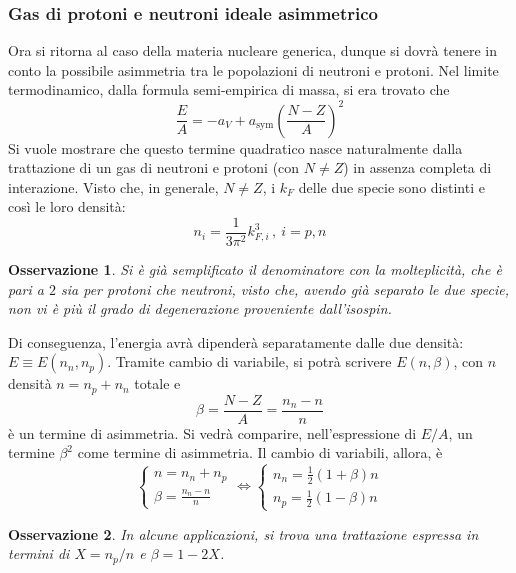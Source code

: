 \documentclass[11pt, a4paper]{scrartcl}
\theoremstyle{style}
\newtheorem{osservazione}{Osservazione}[section]
\numberwithin{equation}{subsection}
\begin{document}
\subsubsection{Gas di protoni e neutroni ideale asimmetrico}

Ora si ritorna al caso della materia nucleare generica, dunque si dovr\`a tenere in conto la possibile asimmetria tra le popolazioni di neutroni e protoni.
Nel limite termodinamico, dalla formula semi-empirica di massa, si era trovato che
\[
\frac{E}{A} = -a_V + a_\text{sym}\left(\frac{N-Z}{A}\right) ^2
\] 
Si vuole mostrare che questo termine quadratico nasce naturalmente dalla trattazione di un gas di neutroni e protoni (con $N\neq Z$) in assenza completa di interazione.
Visto che, in generale, $N\neq Z$, i $k_F$ delle due specie sono distinti e cos\`i le loro densit\`a: 
\[
n_i = \frac{1}{3\pi^2} k_{F,i}^3\, , \ i = p,n
\] 
\begin{osservazione}
Si \`e gi\`a semplificato il denominatore con la molteplicit\`a, che \`e pari a $2$ sia per protoni che neutroni, visto che, avendo gi\`a separato le due specie, non vi \`e pi\`u il grado di degenerazione proveniente dall'isospin. 
\end{osservazione}
\noindent Di conseguenza, l'energia avr\`a dipender\`a separatamente dalle due densit\`a: $E \equiv E(n_n,n_p)$.
Tramite cambio di variabile, si potr\`a scrivere $E(n,\beta )$, con $n$ densit\`a $n=n_p+n_n$ totale e 
\[
\beta  = \frac{N-Z}{A} = \frac{n_n - n}{n}
\] 
\`e un termine di asimmetria.
Si vedr\`a comparire, nell'espressione di $E / A$, un termine $\beta ^2$ come termine di asimmetria.
Il cambio di variabili, allora, \`e
\[
\begin{cases}
	n=n_n + n_p\\
	\beta  =  \frac{n_n - n}{n}
\end{cases} \iff \begin{cases}
	n_n = \frac{1}{2}\left(1 + \beta \right) n\\
	n_p = \frac{1}{2} \left(1- \beta \right) n
\end{cases}
\] 
\begin{osservazione}
In alcune applicazioni, si trova una trattazione espressa in termini di $X = n_p / n$ e $\beta = 1 - 2X$.
\end{osservazione}
\end{document}
